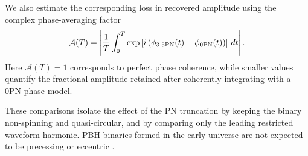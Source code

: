 \documentclass[aps,prd,amsmath,floats,floatfix, twocolumn,
superscriptaddress,nofootinbib,showpacs]{revtex4-2}
\begin{document}
We also estimate the corresponding loss in recovered amplitude using the complex phase-averaging factor
\begin{equation}
    \mathcal{A}(T)
    =
    \left|
    \frac{1}{T}
    \int_0^T
    \exp\left[
        i\left(\phi_{\rm 3.5PN}(t)-\phi_{\rm 0PN}(t)\right)
    \right]
    \, dt
    \right| .
    \label{eq:amplitude_penalty}
\end{equation}
Here $\mathcal{A}(T)=1$ corresponds to perfect phase coherence, while smaller values quantify the fractional amplitude retained after coherently integrating with a 0PN phase model.

These comparisons isolate the effect of the PN truncation by keeping the binary non-spinning and quasi-circular, and by comparing only the leading restricted waveform harmonic. PBH binaries formed in the early universe are not expected to be precessing or eccentric \cite{Peters:1964zz, DeLuca:2020bjf}.


\end{document}
